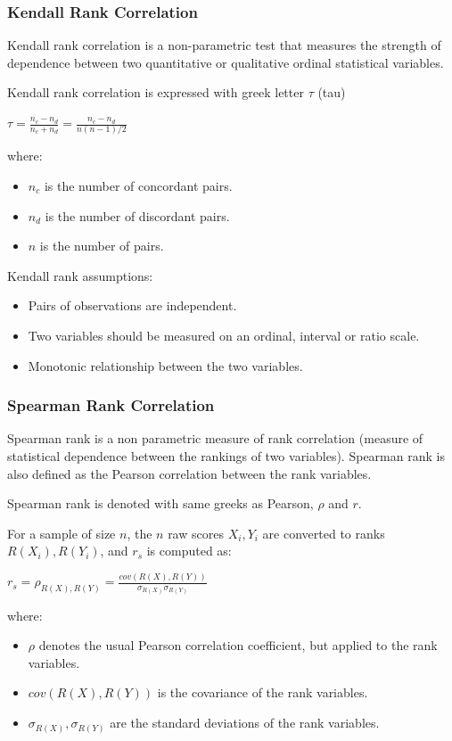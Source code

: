 \documentclass{article}
\begin{document}
\subsubsection{Kendall Rank Correlation}
Kendall rank correlation is a non-parametric test that measures the strength of dependence between two quantitative or qualitative ordinal statistical variables. 

Kendall rank correlation is expressed with greek letter $\tau$ (tau)

$\displaystyle \tau = \frac{n_c - n_d}{n_c + n_d} = \frac{n_c - n_d}{n(n - 1)/2}$

where:
\begin{itemize}
    \item $n_c$ is the number of concordant pairs.
    \item $n_d$ is the number of discordant pairs.
    \item $n$ is the number of pairs.
\end{itemize}

Kendall rank assumptions:
\begin{itemize}
    \item Pairs of observations are independent.
    \item Two variables should be measured on an ordinal, interval or ratio scale.
    \item Monotonic relationship between the two variables.
\end{itemize}

\subsubsection{Spearman Rank Correlation}
Spearman rank is a non parametric measure of rank correlation (measure of statistical dependence between the rankings of two variables). Spearman rank is also defined as the Pearson correlation between the rank variables.

Spearman rank is denoted with same greeks as Pearson, $\rho$ and $r$.

For a sample of size $n$, the $n$ raw scores $ X_{i},Y_{i}$ are converted to ranks ${R} ({X_{i}}), {R} ({Y_{i}})$, and $ r_{s}$ is computed as:

$\displaystyle r_{s}=\rho _{{R} (X), {R} (Y)}={\frac { {cov} ( {R} (X),{R} (Y))}{\sigma _{ {R} (X)}\sigma _{{R} (Y)}}}$

where:
\begin{itemize}
    \item $\rho$ denotes the usual Pearson correlation coefficient, but applied to the rank variables.
    \item ${cov} ( {R} (X),{R} (Y))$  is the covariance of the rank variables.
    \item $\sigma _{ {R} (X)}, \sigma _{{R} (Y)}$ are the standard deviations of the rank variables.
\end{itemize}
\end{document}
